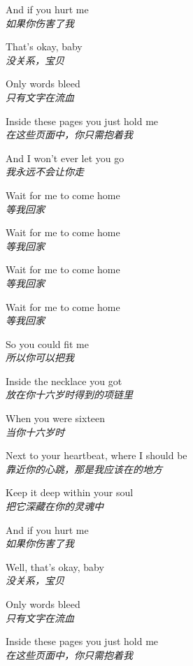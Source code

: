 \begin{spacing}{1.5}
\begin{flushleft}
And if you hurt me\\
\textit{如果你伤害了我}\lyricspace

That's okay, baby\\
\textit{没关系，宝贝}\lyricspace

Only words bleed\\
\textit{只有文字在流血}\lyricspace

Inside these pages you just hold me\\
\textit{在这些页面中，你只需抱着我}\lyricspace

And I won't ever let you go\\
\textit{我永远不会让你走}\lyricspace

Wait for me to come home\\
\textit{等我回家}\lyricspace

Wait for me to come home\\
\textit{等我回家}\lyricspace

Wait for me to come home\\
\textit{等我回家}\lyricspace

Wait for me to come home\\
\textit{等我回家}\lyricspace

So you could fit me\\
\textit{所以你可以把我}\lyricspace

Inside the necklace you got\\
\textit{放在你十六岁时得到的项链里}\lyricspace

When you were sixteen\\
\textit{当你十六岁时}\lyricspace

Next to your heartbeat, where I should be\\
\textit{靠近你的心跳，那是我应该在的地方}\lyricspace

Keep it deep within your soul\\
\textit{把它深藏在你的灵魂中}\lyricspace

And if you hurt me\\
\textit{如果你伤害了我}\lyricspace

Well, that's okay, baby\\
\textit{没关系，宝贝}\lyricspace

Only words bleed\\
\textit{只有文字在流血}\lyricspace

Inside these pages you just hold me\\
\textit{在这些页面中，你只需抱着我}\lyricspace


\end{flushleft}
\end{spacing}
